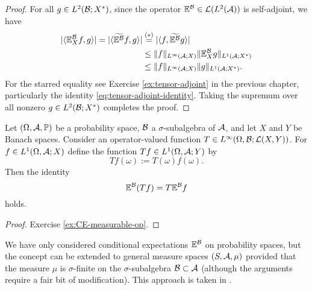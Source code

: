 \begin{proof}
   For all $g \in L^2(\mathcal{B}; X^*)$, since the operator $\mathbb{E}^{\mathcal{B}} \in \mathcal{L}(L^2(\mathcal{A}))$ is self-adjoint, we have
\begin{equation*}
  \begin{aligned}
    | \langle \mathbb{E}_X^{\mathcal{B}} f, g \rangle |
    =  | \langle \widetilde{\mathbb{E}^{\mathcal{B}}} f, g \rangle | 
    &\stackrel{(*)}{=} | \langle f, \widetilde{\mathbb{E}^{\mathcal{B}}} g \rangle | \\
    &\leq  \|f\|_{L^\infty(\mathcal{A};X)} \|\mathbb{E}_X^{\mathcal{B}} g\|_{L^1(\mathcal{A};X^*)} \\
    &\leq  \|f\|_{L^\infty(\mathcal{A};X)} \| g\|_{L^1(\mathcal{A};X^*)}.
  \end{aligned}
\end{equation*}
For the starred equality see Exercise \ref{ex:tensor-adjoint} in the previous chapter, particularly the identity \eqref{eq:tensor-adjoint-identity}.
Taking the supremum over all nonzero $g \in L^2(\mathcal{B};X^*)$ completes the proof.
\end{proof}



\begin{prop}\label{prop:CE-measurable-op}
  Let $(\Omega, \mathcal{A}, \mathbb{P})$ be a probability space, $\mathcal{B}$ a $\sigma$-subalgebra of $\mathcal{A}$, and let $X$ and $Y$ be Banach spaces.
  Consider an operator-valued function $T \in L^\infty(\Omega, \mathcal{B}; \mathcal{L}(X,Y))$.
  For $f \in L^1(\Omega, \mathcal{A}; X)$ define the function $Tf \in L^1(\Omega, \mathcal{A}; Y)$ by
  \begin{equation*}
    Tf(\omega) := T(\omega) f(\omega).
  \end{equation*}
  Then the identity
  \begin{equation*}
    \mathbb{E}^{\mathcal{B}}(Tf) = T \mathbb{E}^{\mathcal{B}}f
  \end{equation*}
  holds.
\end{prop}

\begin{proof}
  Exercise \ref{ex:CE-measurable-op}. %
\end{proof}

\begin{rmk}
  We have only considered conditional expectations $\mathbb{E}^{\mathcal{B}}$ on probability spaces, but the concept can be extended to general measure spaces $(S,\mathcal{A},\mu)$ provided that the measure $\mu$ is $\sigma$-finite on the $\sigma$-subalgebra $\mathcal{B} \subset \mathcal{A}$ (although the arguments require a fair bit of modification).
  This approach is taken in \cite{HNVW16}.
\end{rmk}


